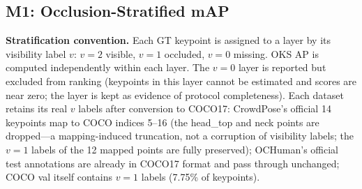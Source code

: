 \documentclass[10pt,conference]{IEEEtran}
\begin{document}
\begin{table}[t]
\centering
\caption{Protocol overview.}
\label{tab:overview}
\renewcommand{\arraystretch}{1.15}
\end{table}

\subsection{M1: Occlusion-Stratified mAP}\textbf{Stratification convention.} Each GT keypoint is assigned to a layer by its visibility label $v$: $v{=}2$ visible, $v{=}1$ occluded, $v{=}0$ missing. OKS AP is computed independently within each layer. The $v{=}0$ layer is reported but excluded from ranking (keypoints in this layer cannot be estimated and scores are near zero; the layer is kept as evidence of protocol completeness). Each dataset retains its real $v$ labels after conversion to COCO17: CrowdPose's official 14 keypoints map to COCO indices 5--16 (the head\_top and neck points are dropped---a mapping-induced truncation, not a corruption of visibility labels; the $v{=}1$ labels of the 12 mapped points are fully preserved); OCHuman's official test annotations are already in COCO17 format and pass through unchanged; COCO val itself contains $v{=}1$ labels (7.75\% of keypoints).
\end{document}
